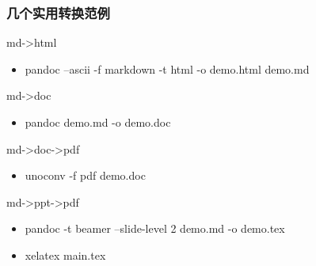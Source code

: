 \begin{frame}\frametitle{几个实用转换范例}

\begin{block}{md-\textgreater{}html}

\begin{itemize}
\item
  pandoc --ascii -f markdown -t html -o demo.html demo.md
\end{itemize}
\end{block}

\begin{block}{md-\textgreater{}doc}

\begin{itemize}
\item
  pandoc demo.md -o demo.doc
\end{itemize}
\end{block}

\begin{block}{md-\textgreater{}doc-\textgreater{}pdf}

\begin{itemize}
\item
  unoconv -f pdf demo.doc
\end{itemize}
\end{block}

\begin{block}{md-\textgreater{}ppt-\textgreater{}pdf}

\begin{itemize}
\item
  pandoc -t beamer --slide-level 2 demo.md -o demo.tex
\item
  xelatex main.tex
\end{itemize}
\end{block}

\end{frame}
